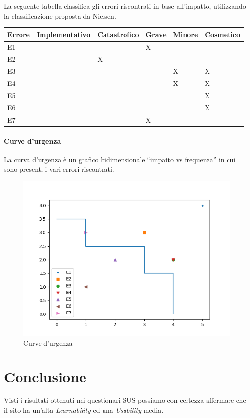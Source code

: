 \documentclass[12pt,italian,]{report}
\begin{document}
La seguente tabella classifica gli errori riscontrati in base
all'impatto, utilizzando la classificazione proposta da Nielsen.

\begin{longtable}[]{@{}llllll@{}}
\toprule
Errore & Implementativo & Catastrofico & Grave & Minore &
Cosmetico\tabularnewline
\midrule
\endhead
E1 & & & X & &\tabularnewline
E2 & & X & & &\tabularnewline
E3 & & & & X & X\tabularnewline
E4 & & & & X & X\tabularnewline
E5 & & & & & X\tabularnewline
E6 & & & & & X\tabularnewline
E7 & & & X & &\tabularnewline
\bottomrule
\end{longtable}

\hypertarget{curve-durgenza}{%
\subsubsection{Curve d'urgenza}\label{curve-durgenza}}

La curva d'urgenza è un grafico bidimensionale ``impatto vs frequenza''
in cui sono presenti i vari errori riscontrati.

\begin{figure}[h]
\centering
\includegraphics{img/curva_urgenza.png}
\caption{Curve d'urgenza}
\end{figure}

\hypertarget{conclusione}{%
\chapter{Conclusione}\label{conclusione}}

Visti i risultati ottenuti nei questionari SUS possiamo con certezza
affermare che il sito ha un'alta \emph{Learnability} ed una
\emph{Usability} media.
\end{document}
